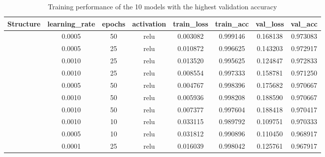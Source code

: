 \documentclass[a4paper]{article}
\begin{document}
\begin{table}[ht]
    \centering
    \caption{Training performance of the 10 models with the highest validation accuracy}
    \label{tab:ann_performance_top10_validation_accuracy}
    \begin{tabular}{|| c c c c | c c c c ||}
  
    \hline
    \centering
    \textbf{Structure}  &\textbf{learning\_rate} &\textbf{epochs}    &\textbf{activation}    & \textbf{train\_loss}   &\textbf{train\_acc} &\textbf{val\_loss}  &\textbf{val\_acc} \\
    \hline \hline
    [64,32,16]          & 0.0005                & 50                & relu                  & 0.003082              & 0.999146          &0.168138           & 0.973083 \\ 
    \hline
    [64,32,16]          & 0.0005                & 25                & relu                  & 0.010872              & 0.996625          &0.143203           & 0.972917 \\ 
    \hline
    [64,32,16]          & 0.0010                & 25                & relu                  & 0.013520              & 0.995625          &0.124847           & 0.972833 \\ 
    \hline
    [64,32]             & 0.0010                & 25                & relu                  & 0.008554              & 0.997333          &0.158781           & 0.971250 \\ 
    \hline
    [64,32]             & 0.0005                & 50                & relu                  & 0.004767              & 0.998396          &0.175682           & 0.970667 \\ 
    \hline
    [64,32]             & 0.0010                & 50                & relu                  & 0.005936              & 0.998208          &0.188590           & 0.970667 \\ 
    \hline
    [64,32,16]          & 0.0010                & 50                & relu                  & 0.007377              & 0.997604          &0.188418           & 0.970417 \\ 
    \hline
    [64,32]             & 0.0010                & 10                & relu                  & 0.033115              & 0.989792          &0.109751           & 0.970333 \\ 
    \hline
    [64,32]             & 0.0005                & 10                & relu                  & 0.031812              & 0.990896          &0.110450           & 0.968917 \\ 
    \hline
    [64,32]             & 0.0001                & 25                & relu                  & 0.016039              & 0.998042          &0.125761           & 0.967917 \\ 
    \hline
    \end{tabular}
\end{table}
\end{document}
